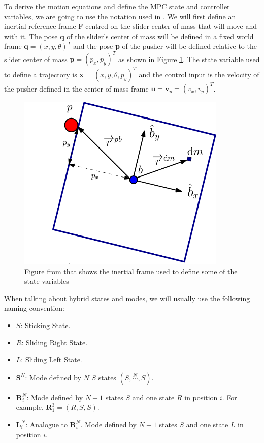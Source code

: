 \documentclass[12,twoside]{TFG-GM}
\theoremstyle{definition}
\theoremstyle{remark}
\begin{document}
To derive the motion equations and define the MPC state and controller variables, we are going to use the notation used in \cite{fom}. We will first define an inertial reference frame F centred on the slider center of mass that will move and with it. The pose $\textbf{q}$ of the slider's center of mass  will be defined in a fixed world frame $\textbf{q} = (x, y, \theta)^T$ and the pose \textbf{p} of the pusher will be defined relative to the slider center of mass $\textbf{p} = (p_x, p_y)^T$ as shown in Figure \ref{fig:inertial_frame}. The state variable used to define a trajectory is \textbf{x} = $(x, y, \theta, p_y)^T$ and the control input is the velocity of the pusher defined in the center of mass frame $\textbf{u} = \textbf{v}_p = (v_x, v_y)^T$.

\begin{figure}[htb!]
\begin{center}
\includegraphics[width=10cm]{inertial_frame.png}
\end{center}
\caption[test caption]{\label{fig:inertial_frame} \small{Figure from \protect\cite{fom} that shows the inertial frame used to define some of the state variables}}
\end{figure}

When talking about hybrid states and modes, we will usually use the following naming convention:
\begin{itemize}
\item {$S$:} Sticking State.
\item {$R$:} Sliding Right State.
\item {$L$:} Sliding Left State.
\item {$\textbf{S}^N$:} Mode defined by $N$ $S$ states $(S, \stackrel{N}{\cdots}, S)$.
\item {$\textbf{R}_i^N$:} Mode defined by $N - 1$ states $S$ and one state $R$ in position $i$. For example, $\textbf{R}_1^3 = (R, S, S)$.
\item {$\textbf{L}_i^N$:} Analogue to $\textbf{R}_i^N$. Mode defined by $N - 1$ states $S$ and one state $L$ in position $i$.
\end{itemize}
\end{document}
